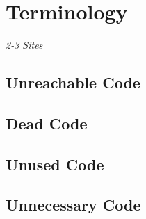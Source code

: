 \chapter {Terminology}
\label {cha:terminology}
\emph{2-3 Sites}
\section{Unreachable Code}
\section{Dead Code}
\section{Unused Code}
\section{Unnecessary Code}